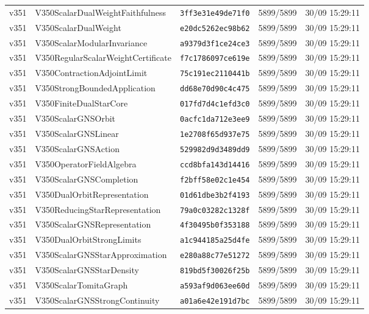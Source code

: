 \documentclass[11pt]{article}
\theoremstyle{definition}\newtheorem{deriv}{Derivation}
\begin{document}
{\begin{longtable}{@{}lllll@{}}
v351 & V350ScalarDualWeightFaithfulness & \texttt{3ff3e31e49de71f0} & 5899/5899 & 30/09 15:29:11 \\
v351 & V350ScalarDualWeight & \texttt{e20dc5262ec98b62} & 5899/5899 & 30/09 15:29:11 \\
v351 & V350ScalarModularInvariance & \texttt{a9379d3f1ce24ce3} & 5899/5899 & 30/09 15:29:11 \\
v351 & V350RegularScalarWeightCertificate & \texttt{f7c1786097ce619e} & 5899/5899 & 30/09 15:29:11 \\
v351 & V350ContractionAdjointLimit & \texttt{75c191ec2110441b} & 5899/5899 & 30/09 15:29:11 \\
v351 & V350StrongBoundedApplication & \texttt{dd68e70d90c4c475} & 5899/5899 & 30/09 15:29:11 \\
v351 & V350FiniteDualStarCore & \texttt{017fd7d4c1efd3c0} & 5899/5899 & 30/09 15:29:11 \\
v351 & V350ScalarGNSOrbit & \texttt{0acfc1da712e3ee9} & 5899/5899 & 30/09 15:29:11 \\
v351 & V350ScalarGNSLinear & \texttt{1e2708f65d937e75} & 5899/5899 & 30/09 15:29:11 \\
v351 & V350ScalarGNSAction & \texttt{529982d9d3489dd9} & 5899/5899 & 30/09 15:29:11 \\
v351 & V350OperatorFieldAlgebra & \texttt{ccd8bfa143d14416} & 5899/5899 & 30/09 15:29:11 \\
v351 & V350ScalarGNSCompletion & \texttt{f2bff58e02c1e454} & 5899/5899 & 30/09 15:29:11 \\
v351 & V350DualOrbitRepresentation & \texttt{01d61dbe3b2f4193} & 5899/5899 & 30/09 15:29:11 \\
v351 & V350ReducingStarRepresentation & \texttt{79a0c03282c1328f} & 5899/5899 & 30/09 15:29:11 \\
v351 & V350ScalarGNSRepresentation & \texttt{4f30495b0f353188} & 5899/5899 & 30/09 15:29:11 \\
v351 & V350DualOrbitStrongLimits & \texttt{a1c944185a25d4fe} & 5899/5899 & 30/09 15:29:11 \\
v351 & V350ScalarGNSStarApproximation & \texttt{e280a88c77e51272} & 5899/5899 & 30/09 15:29:11 \\
v351 & V350ScalarGNSStarDensity & \texttt{819bd5f30026f25b} & 5899/5899 & 30/09 15:29:11 \\
v351 & V350ScalarTomitaGraph & \texttt{a593af9d063ee60d} & 5899/5899 & 30/09 15:29:11 \\
v351 & V350ScalarGNSStrongContinuity & \texttt{a01a6e42e191d7bc} & 5899/5899 & 30/09 15:29:11 \\

\end{longtable}}
\end{document}
